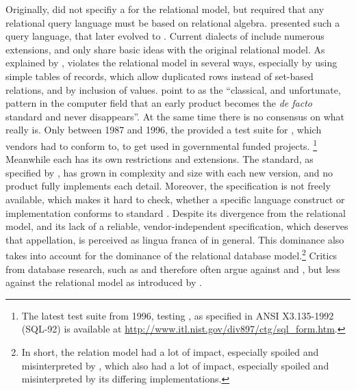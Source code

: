 Originally,  did not specifiy a 
for the relational model, but required that any relational query language must
be based on relational algebra. \textcite{Chamberlin1974} presented such a query 
language, that later evolved to . Current dialects of  
include numerous extensions, and only share basic ideas with the original
relational model. As explained by \textcite{Darwen1995},  violates
the relational model in several ways, especially by using simple tables of
records, which allow duplicated rows instead of set-based relations, and by 
inclusion of  values. \textcite{Atkinson1989} point to
 as the ``classical, and unfortunate, pattern in the computer field 
that an early product becomes the \emph{de facto} standard and never disappears''.
At the same time there is no consensus on what  really is.
Only between 1987 and 1996, the  provided a test suite for , which  
vendors had to conform to, to get used in governmental funded projects.%
\footnote{The latest test suite from 1996, testing , as specified
in ANSI X3.135-1992 (SQL-92) is available at %
\url{http://www.itl.nist.gov/div897/ctg/sql_form.htm}.}
Meanwhile each  has its own restrictions and extensions. 
The  standard, as specified by , has grown in complexity 
and size with each new version, and no product fully implements each detail.
Moreover, the specification is not freely available, which makes it hard to 
check, whether a specific language construct or implementation conforms to
standard . Despite its divergence from the relational model, and 
its lack of a reliable, vendor-independent specification, which deserves that 
appellation,  is perceived as lingua franca of  in 
general. This dominance also takes into account for the dominance of the 
relational database model.\footnote{In short, the relation model had a
lot of impact, especially spoiled and misinterpreted by
, which also had a lot of impact, especially spoiled and 
misinterpreted by its differing implementations.}
Critics from database research, such as \textcite{Stonebraker2007} and
\textcite{Darwen1995} therefore often argue against  and 
, but less against the relational model as introduced by 
.


